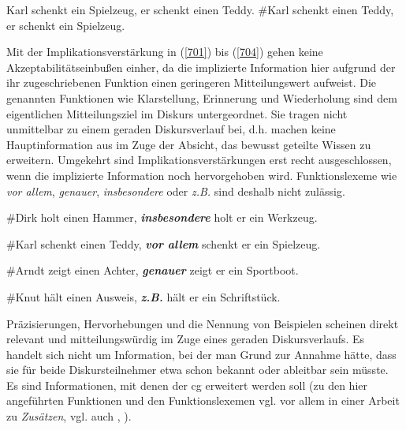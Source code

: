 \begin{exe}
	\ex\label{708} 
		\begin{xlist}	
			\ex\label{708a} Karl schenkt ein Spielzeug, er schenkt einen Teddy.
			\ex\label{708b} \#Karl schenkt einen Teddy, er schenkt ein Spielzeug.
		\end{xlist}
\end{exe}	
Mit der Implikationsverstärkung in (\ref{701}) bis (\ref{704}) gehen keine Akzeptabilitätseinbußen einher, da die implizierte Information hier aufgrund der ihr zugeschriebenen Funktion einen geringeren Mitteilungswert aufweist. Die genannten Funktionen wie Klarstellung, Erinnerung und Wiederholung sind dem eigentlichen Mitteilungsziel im Diskurs untergeordnet. Sie tragen nicht unmittelbar zu einem geraden Diskursverlauf bei, d.h. machen keine Hauptinformation aus im Zuge der Absicht, das bewusst geteilte Wissen zu erweitern. Umgekehrt sind Implikationsverstärkungen erst recht ausgeschlossen, wenn die implizierte Information noch hervorgehoben wird. Funktionslexeme wie \textit{vor allem}, \textit{genauer}, \textit{insbesondere} oder \textit{z.B.} sind deshalb nicht zulässig.

\begin{exe}
	\ex\label{709} 
	\#Dirk holt einen Hammer, \textbf{\textit{insbesondere}} holt er ein Werkzeug.
\end{exe}
\vspace{-0.65cm}
\begin{exe}
	\ex\label{710} 
	\#Karl schenkt einen Teddy, \textbf{\textit{vor allem}} schenkt er ein Spielzeug.
\end{exe}
\vspace{-0.65cm}
\begin{exe}
	\ex\label{711} 
	\#Arndt zeigt einen Achter, \textbf{\textit{genauer}} zeigt er ein Sportboot.
\end{exe}
\vspace{-0.65cm}
\begin{exe}
	\ex\label{712} 
	\#Knut hält einen Ausweis, \textbf{\textit{z.B.}} hält er ein Schriftstück.
\end{exe}
Präzisierungen, Hervorhebungen und die Nennung von Beispielen scheinen direkt relevant und mitteilungswürdig im Zuge eines geraden Diskursverlaufs. Es handelt sich nicht um Information, bei der man Grund zur Annahme hätte, dass sie für beide Diskursteilnehmer etwa schon bekannt oder ableitbar sein müsste. Es sind Informationen, mit denen der cg erweitert werden soll (zu den hier angeführten Funktionen und den Funktionslexemen vgl. vor allem \citealt{Schindler1990} in einer Arbeit zu  \textit{Zusätzen}, vgl. auch \citealt{Auer1991}, \citealt{Freienstein2008}).

